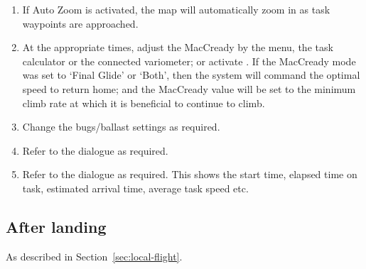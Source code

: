 \begin{enumerate}
\item If Auto Zoom is activated, the map will automatically zoom in as task 
  waypoints are approached.

\item  At the appropriate times, adjust the MacCready by the menu,
  the task calculator or the connected variometer; or activate .
  If the MacCready mode was set to `Final Glide' or `Both', then the system will 
  command the optimal   speed to return home; and the MacCready value will be 
  set to the minimum climb rate at which it is beneficial to continue to climb.
  
\item  Change the bugs/ballast settings as required.
\item  Refer to the  dialogue as required. 
\item  Refer to the  dialogue as required.  This shows the start
  time, elapsed time on task, estimated arrival time, average task speed etc.
\end{enumerate}

\subsection*{After landing}
As described in Section~\ref{sec:local-flight}.


